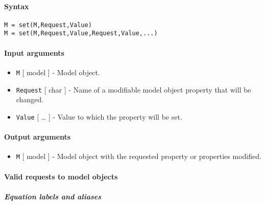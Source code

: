 


	\paragraph{Syntax}\label{syntax}

\begin{verbatim}
M = set(M,Request,Value)
M = set(M,Request,Value,Request,Value,...)
\end{verbatim}

\paragraph{Input arguments}\label{input-arguments}

\begin{itemize}
\item
  \texttt{M} {[} model {]} - Model object.
\item
  \texttt{Request} {[} char {]} - Name of a modifiable model object
  property that will be changed.
\item
  \texttt{Value} {[} \ldots{} {]} - Value to which the property will be
  set.
\end{itemize}

\paragraph{Output arguments}\label{output-arguments}

\begin{itemize}
\itemsep1pt\parskip0pt
\item
  \texttt{M} {[} model {]} - Model object with the requested property or
  properties modified.
\end{itemize}

\paragraph{Valid requests to model
objects}\label{valid-requests-to-model-objects}

\subparagraph{Equation labels and
aliases}\label{equation-labels-and-aliases}

